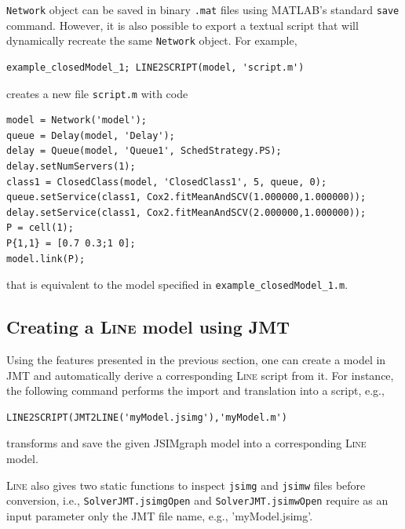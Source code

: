 \texttt{Network} object can be saved in binary \texttt{.mat} files using MATLAB's standard \texttt{save} command. However, it is also possible to export a textual script that will dynamically recreate the same \texttt{Network} object. For example,
\begin{lstlisting}
example_closedModel_1; LINE2SCRIPT(model, 'script.m')
\end{lstlisting}
creates a new file \texttt{script.m} with code
\begin{lstlisting}
model = Network('model');
queue = Delay(model, 'Delay');
delay = Queue(model, 'Queue1', SchedStrategy.PS);
delay.setNumServers(1);
class1 = ClosedClass(model, 'ClosedClass1', 5, queue, 0);
queue.setService(class1, Cox2.fitMeanAndSCV(1.000000,1.000000));
delay.setService(class1, Cox2.fitMeanAndSCV(2.000000,1.000000));
P = cell(1);
P{1,1} = [0.7 0.3;1 0];
model.link(P);
\end{lstlisting}
that is equivalent to the model specified in \texttt{example\_closedModel\_1.m}.

\subsection{Creating a \textsc{Line} model using JMT}
Using the features presented in the previous section, one can create a model in JMT and automatically derive a corresponding \textsc{Line} script from it. For instance, the following command performs the import and translation into a script, e.g.,
\begin{lstlisting}
LINE2SCRIPT(JMT2LINE('myModel.jsimg'),'myModel.m')
\end{lstlisting}
transforms and save the given JSIMgraph model into a corresponding \textsc{Line} model.

\textsc{Line} also gives two static functions to inspect \texttt{jsimg} and \texttt{jsimw} files before conversion, i.e.,
\texttt{SolverJMT.jsimgOpen} and \texttt{SolverJMT.jsimwOpen} require as an input parameter only the JMT file name, e.g., 'myModel.jsimg'.

